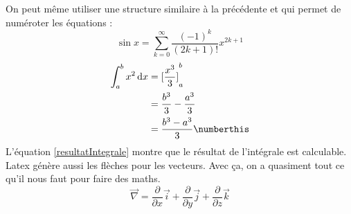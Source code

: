 On peut même utiliser une structure similaire à la précédente et qui permet de numéroter les équations : \begin{equation}
\sin x=\sum_{k=0}^{\infty}\frac{(-1)^k}{(2k+1)!}x^{2k+1}
\end{equation}
\begin{align*}
	\int_a^b x^2 \, \mathrm dx & = {\lbrack \frac{x^3}{3} \rbrack}_a^b                     \\
	                           & = \frac{b^3}{3} - \frac{a^3}{3}                           \\
	                           & = \frac{b^3-a^3}{3} \numberthis \label{resultatIntegrale} 
\end{align*}
L'équation \eqref{resultatIntegrale} montre que le résultat de l'intégrale est calculable.
\medbreak
Latex génère aussi les flèches pour les vecteurs. Avec ça, on a quasiment tout ce qu'il nous faut pour faire des maths.
$$
\overrightarrow{\nabla }=\frac{\partial }{\partial x}\overrightarrow{i}+\frac{\partial }{\partial y}\overrightarrow{j}+\frac{\partial }{\partial z}
\overrightarrow{k}
$$